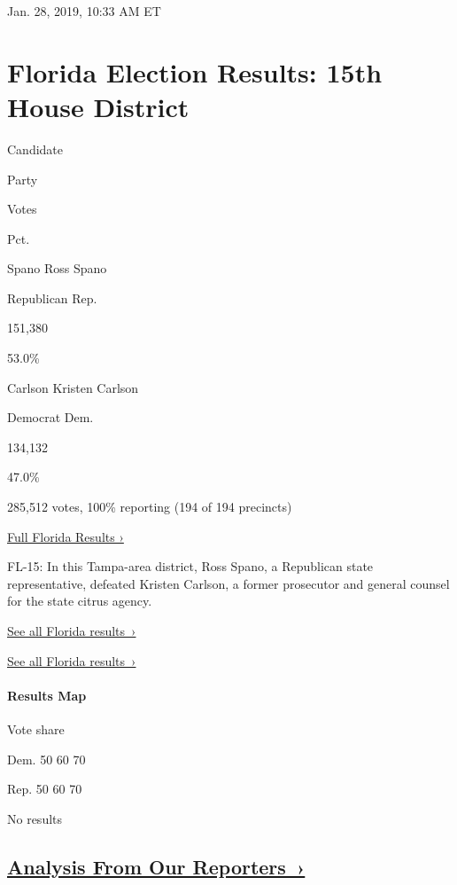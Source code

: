 Jan. 28, 2019, 10:33 AM ET

\hypertarget{florida-election-results-15th-house-district}{%
\section{Florida Election Results: 15th House
District}\label{florida-election-results-15th-house-district}}

Candidate

Party

Votes

Pct.

 Spano Ross Spano

Republican Rep.

151,380

53.0\%

 Carlson Kristen Carlson

Democrat Dem.

134,132

47.0\%

285,512 votes, 100\% reporting (194 of 194 precincts)

\href{https://www.nytimes3xbfgragh.onion/interactive/2018/11/06/us/elections/results-florida-elections.html}{Full
Florida Results ›}

FL-15: In this Tampa-area district, Ross Spano, a Republican state
representative, defeated Kristen Carlson, a former prosecutor and
general counsel for the state citrus agency.

\href{https://www.nytimes3xbfgragh.onion/interactive/2018/11/06/us/elections/results-florida-elections.html}{See
all Florida results~›}

\href{https://www.nytimes3xbfgragh.onion/interactive/2018/11/06/us/elections/results-florida-elections.html}{See
all Florida results~›}

\hypertarget{results-map}{%
\paragraph{Results Map}\label{results-map}}

Vote share

Dem. 50 60 70

Rep. 50 60 70

No results

\hypertarget{analysis-from-our-reporters-}{%
\subsection{\texorpdfstring{\href{https://www.nytimes3xbfgragh.onion/interactive/2018/11/06/us/elections/live-midterm-election-analysis-updates.html}{Analysis
From Our
Reporters~›}}{Analysis From Our Reporters~›}}\label{analysis-from-our-reporters-}}

